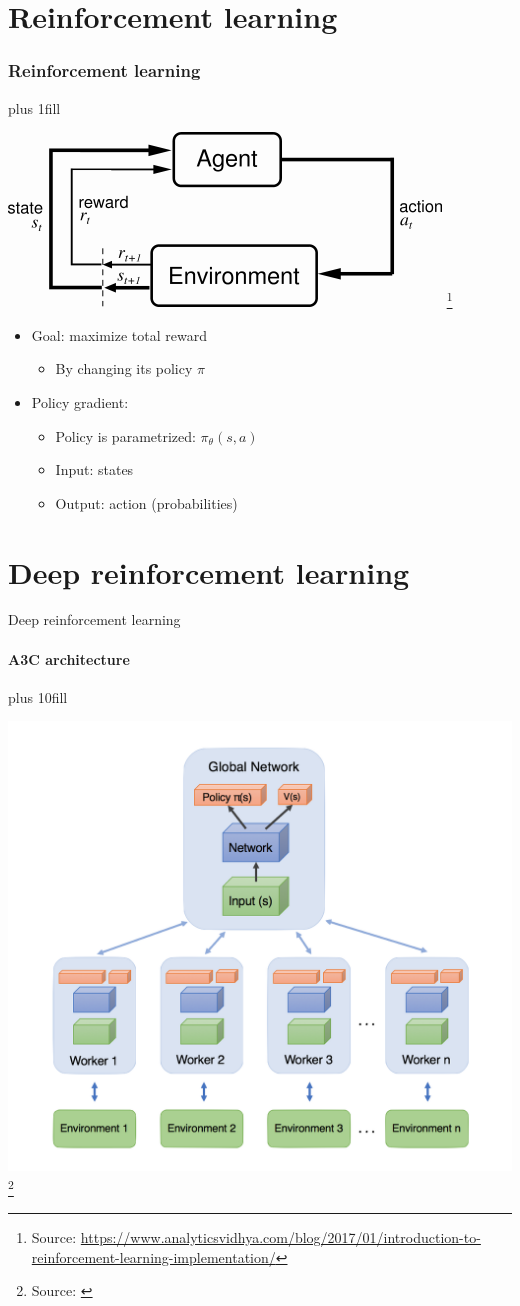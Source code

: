 \documentclass{beamer}
\begin{document}
\section{Reinforcement learning}
\begin{frame}[fragile]\frametitle{Reinforcement learning}
\vskip0pt plus 1fill
\begin{center}
    \includegraphics[width=.7\linewidth]{reinforcementlearning.png}
    \footnote{Source: \url{https://www.analyticsvidhya.com/blog/2017/01/introduction-to-reinforcement-learning-implementation/}}
\end{center}
\begin{itemize}
    \item Goal: maximize total reward
    \begin{itemize}
        \item By changing its policy $\pi$
    \end{itemize}
    \item Policy gradient:
    \begin{itemize}
        \item Policy is parametrized: $\pi_\theta(s,a)$
        \item Input: states
        \item Output: action (probabilities)
    \end{itemize}
\end{itemize}
\end{frame}

\section{Deep reinforcement learning}
\begin{frame}[fragile]{Deep reinforcement learning}
\framesubtitle{A3C architecture}
\vskip0pt plus 10fill
\begin{center}
    \includegraphics[width=.7\linewidth]{A3Carchitecture} \footnote{Source: \cite{Juliani2016A3C}}
\end{center}
\end{frame}
\end{document}
